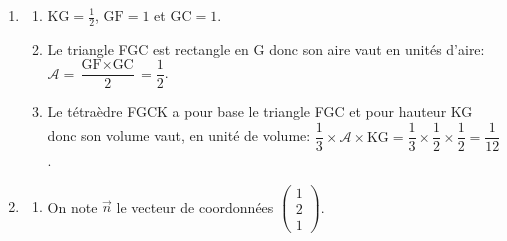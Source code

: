 \documentclass[10pt]{article}
\providecommand{\vect}[1]{\overrightarrow{#1}}
\providecommand{\vectt}[1]{\overrightarrow{\mathrm{#1}}}
\begin{document}
\begin{enumerate}
$\vectt{CF}$ et $\vectt{CK}$ ont pour coordonnées respectives
$\begin{pmatrix}
x_{\text F}-x_{\text C} \\ y_{\text F}-y_{\text C} \\ z_{\text F}-z_{\text C} 
\end{pmatrix}
=
\begin{pmatrix}
-1 \\ 0 \\ 1
\end{pmatrix}$
et
$\begin{pmatrix}
x_{\text K}-x_{\text C} \\ y_{\text K}-y_{\text C} \\ z_{\text K}-z_{\text C} 
\end{pmatrix}
=
\begin{pmatrix}
0 \\ -\frac{1}{2} \\ 1
\end{pmatrix}$.

Donc les vecteurs $\vectt{CF}$ et $\vectt{CK}$ ne sont pas colinéaires donc les points C, F et K ne sont pas alignés, et donc ces trois points définissent un plan.

\item 
	\begin{enumerate}
		\item $\text{KG}=\frac{1}{2}$, $\text{GF}=1$ et $\text{GC}=1$.
		\item Le triangle FGC est rectangle en G donc son aire vaut en unités d'aire:\\
		$\mathcal{A}=\dfrac{\text{GF}\times\text{GC}}{2}=\dfrac{1}{2}$.
		\item Le tétraèdre FGCK a pour base le triangle FGC et pour hauteur KG donc son volume vaut, en unité de volume:	
		$\dfrac{1}{3}\times \mathcal{A}\times \text{KG}=\dfrac{1}{3}\times \dfrac{1}{2}\times\dfrac{1}{2}=\dfrac{1}{12}$.
	\end{enumerate}

\item 
	\begin{enumerate}
		\item On note $\vect{n}$ le vecteur de coordonnées $\begin{pmatrix}1\\2\\1\end{pmatrix}$.
		




\end{enumerate}
\end{enumerate}
\end{document}

